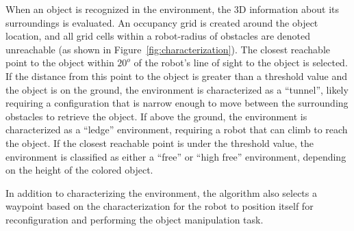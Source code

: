 \documentclass[conference]{IEEEtran}
\begin{document}
When an object is recognized in the environment, the 3D information about its surroundings is evaluated. An occupancy grid is created around the object location, and all grid cells within a robot-radius of obstacles are denoted unreachable (as shown in Figure~\ref{fig:characterization}). The closest reachable point to the object within $20^o$ of the robot's line of sight to the object is selected. If the distance from this point to the object is greater than a threshold value and the object is on the ground, the environment is characterized as a ``tunnel'', likely requiring a configuration that is narrow enough to move between the surrounding obstacles to retrieve the object. If above the ground, the environment is characterized as a ``ledge'' environment, requiring a robot that can climb to reach the object. If the closest reachable point is under the threshold value, the environment is classified as either a ``free'' or ``high free'' environment, depending on the height of the colored object.

In addition to characterizing the environment, the algorithm also selects a waypoint based on the characterization for the robot to position itself for reconfiguration and performing the object manipulation task.
\end{document}
